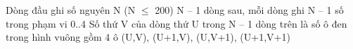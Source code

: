 Dòng đầu ghi số nguyên N (N $\le$ 200)  N – 1 dòng sau, mỗi dòng ghi N – 1 số trong phạm vi 0..4  Số thứ V của dòng thứ U trong N – 1 dòng trên là số ô đen trong hình vuông gồm 4 ô (U,V), (U+1,V), (U,V+1), (U+1,V+1)  

\